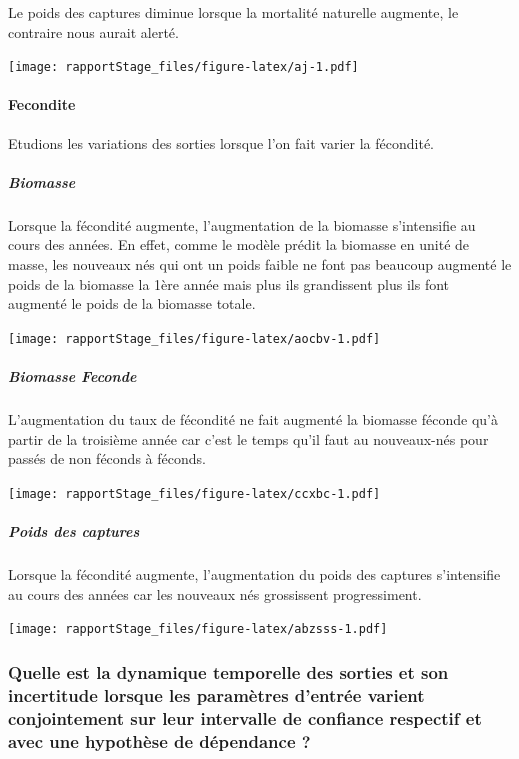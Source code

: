 \documentclass[
]{article}
\begin{document}
Le poids des captures diminue lorsque la mortalité naturelle augmente,
le contraire nous aurait alerté.

\texttt{[image: rapportStage\_files/figure-latex/aj-1.pdf]}

\hypertarget{fecondite}{%
\paragraph{Fecondite}\label{fecondite}}

Etudions les variations des sorties lorsque l'on fait varier la
fécondité.

\hypertarget{biomasse-5}{%
\subparagraph{Biomasse}\label{biomasse-5}}

Lorsque la fécondité augmente, l'augmentation de la biomasse
s'intensifie au cours des années. En effet, comme le modèle prédit la
biomasse en unité de masse, les nouveaux nés qui ont un poids faible ne
font pas beaucoup augmenté le poids de la biomasse la 1ère année mais
plus ils grandissent plus ils font augmenté le poids de la biomasse
totale.

\texttt{[image: rapportStage\_files/figure-latex/aocbv-1.pdf]}

\hypertarget{biomasse-feconde-4}{%
\subparagraph{Biomasse Feconde}\label{biomasse-feconde-4}}

L'augmentation du taux de fécondité ne fait augmenté la biomasse féconde
qu'à partir de la troisième année car c'est le temps qu'il faut au
nouveaux-nés pour passés de non féconds à féconds.

\texttt{[image: rapportStage\_files/figure-latex/ccxbc-1.pdf]}

\hypertarget{poids-des-captures-4}{%
\subparagraph{Poids des captures}\label{poids-des-captures-4}}

Lorsque la fécondité augmente, l'augmentation du poids des captures
s'intensifie au cours des années car les nouveaux nés grossissent
progressiment.

\texttt{[image: rapportStage\_files/figure-latex/abzsss-1.pdf]}

\hypertarget{quelle-est-la-dynamique-temporelle-des-sorties-et-son-incertitude-lorsque-les-paramuxe8tres-dentruxe9e-varient-conjointement-sur-leur-intervalle-de-confiance-respectif-et-avec-une-hypothuxe8se-de-duxe9pendance}{%
\subsubsection{Quelle est la dynamique temporelle des sorties et son
incertitude lorsque les paramètres d'entrée varient conjointement sur
leur intervalle de confiance respectif et avec une hypothèse de
dépendance
?}\label{quelle-est-la-dynamique-temporelle-des-sorties-et-son-incertitude-lorsque-les-paramuxe8tres-dentruxe9e-varient-conjointement-sur-leur-intervalle-de-confiance-respectif-et-avec-une-hypothuxe8se-de-duxe9pendance}}
\end{document}
